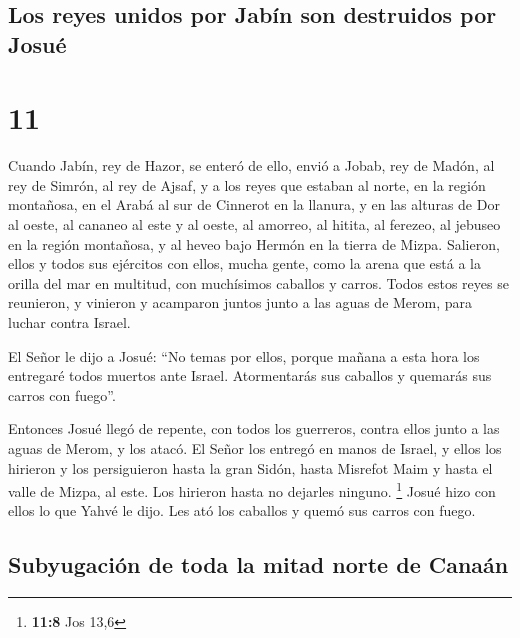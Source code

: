 \hypertarget{los-reyes-unidos-por-jabuxedn-son-destruidos-por-josuuxe9}{%
\subsection{Los reyes unidos por Jabín son destruidos por
Josué}\label{los-reyes-unidos-por-jabuxedn-son-destruidos-por-josuuxe9}}

\hypertarget{section-10}{%
\section{11}\label{section-10}}

 Cuando Jabín, rey de Hazor, se enteró de ello, envió a
Jobab, rey de Madón, al rey de Simrón, al rey de Ajsaf,  y
a los reyes que estaban al norte, en la región montañosa, en el Arabá al
sur de Cinnerot en la llanura, y en las alturas de Dor al oeste,
 al cananeo al este y al oeste, al amorreo, al hitita, al
ferezeo, al jebuseo en la región montañosa, y al heveo bajo Hermón en la
tierra de Mizpa.  Salieron, ellos y todos sus ejércitos
con ellos, mucha gente, como la arena que está a la orilla del mar en
multitud, con muchísimos caballos y carros.  Todos estos
reyes se reunieron, y vinieron y acamparon juntos junto a las aguas de
Merom, para luchar contra Israel.

 El Señor le dijo a Josué: ``No temas por ellos, porque
mañana a esta hora los entregaré todos muertos ante Israel. Atormentarás
sus caballos y quemarás sus carros con fuego''.

 Entonces Josué llegó de repente, con todos los guerreros,
contra ellos junto a las aguas de Merom, y los atacó.  El
Señor los entregó en manos de Israel, y ellos los hirieron y los
persiguieron hasta la gran Sidón, hasta Misrefot Maim y hasta el valle
de Mizpa, al este. Los hirieron hasta no dejarles ninguno. \footnote{\textbf{11:8}
  Jos 13,6}  Josué hizo con ellos lo que Yahvé le dijo.
Les ató los caballos y quemó sus carros con fuego.

\hypertarget{subyugaciuxf3n-de-toda-la-mitad-norte-de-canauxe1n}{%
\subsection{Subyugación de toda la mitad norte de
Canaán}\label{subyugaciuxf3n-de-toda-la-mitad-norte-de-canauxe1n}}

